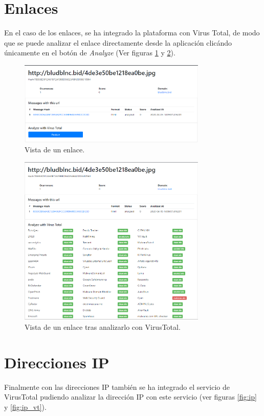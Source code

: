 \clearpage
\section{Enlaces} \label{vista_enlaces}
En el caso de los enlaces, se ha integrado la plataforma con Virus Total, de modo que se puede analizar el enlace directamente desde la aplicación clicándo únicamente en el botón de \textit{Analyze} (Ver figuras \ref{fig:enlace} y \ref{fig:enlace_vt}).

\begin{figure}[htb]
    \centering
    \includegraphics[width=0.8\textwidth]{imagenes/capturasAplicacion/Enlaces.png}
\caption{Vista de un enlace.}
\label{fig:enlace}
\end{figure}


\begin{figure}[htb]
    \centering
    \includegraphics[width=0.8\textwidth]{imagenes/capturasAplicacion/Enlaces_virusTotal.png}
\caption{Vista de un enlace tras analizarlo con VirusTotal.}
\label{fig:enlace_vt}
\end{figure}

\clearpage
\section{Direcciones IP} \label{vista_ip}
Finalmente con las direcciones IP también se ha integrado el servicio de VirusTotal pudiendo analizar la dirección IP con este servicio (ver figuras \ref{fig:ip} y \ref{fig:ip_vt}).

